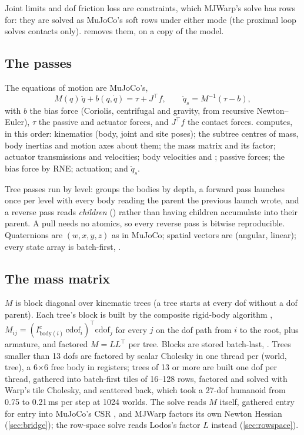 Joint limits and dof friction loss are constraints, which MJWarp's solve has rows for: they are solved as MuJoCo's soft rows under either mode (the proximal loop solves contacts only).  removes them, on a copy of the model.

\subsection{The passes}\label{sec:passes}

The equations of motion are MuJoCo's,
\begin{equation}\label{eq:eom}
M(q)\,\ddot q + b(q, \dot q) = \tau + J^\top f, \qquad \ddot q_s = M^{-1}(\tau - b),
\end{equation}
with $b$ the bias force (Coriolis, centrifugal and gravity, from recursive Newton--Euler), $\tau$ the passive and actuator forces, and $J^\top f$ the contact forces.  computes, in this order: kinematics (body, joint and site poses); the subtree centres of mass, body inertias and motion axes  about them; the mass matrix and its factor; actuator transmissions and velocities; body velocities and ; passive forces; the bias force by RNE; actuation;  and $\ddot q_s$.

Tree passes run by level:  groups the bodies by depth, a forward pass launches once per level with every body reading the parent the previous launch wrote, and a reverse pass reads \emph{children} () rather than having children accumulate into their parent. A pull needs no atomics, so every reverse pass is bitwise reproducible. Quaternions are $(w, x, y, z)$ as in MuJoCo; spatial vectors are (angular, linear); every state array is batch-first, .

\subsection{The mass matrix}\label{sec:mass}

$M$ is block diagonal over kinematic trees (a tree starts at every dof without a dof parent). Each tree's block is built by the composite rigid-body algorithm \cite{featherstone}, $M_{ij} = (I^c_{\text{body}(i)}\, \mathrm{cdof}_i)^\top \mathrm{cdof}_j$ for every $j$ on the dof path from $i$ to the root, plus armature, and factored $M = LL^\top$ per tree. Blocks are stored batch-last, . Trees smaller than 13 dofs are factored by scalar Cholesky in one thread per (world, tree), a 6$\times$6 free body in registers; trees of 13 or more are built one dof per thread, gathered into batch-first tiles of 16--128 rows, factored and solved with Warp's tile Cholesky, and scattered back, which took a 27-dof humanoid from 0.75 to 0.21\,ms per step at 1024 worlds. The solve reads $M$ itself, gathered entry for entry into MuJoCo's CSR , and MJWarp factors its own Newton Hessian (\cref{sec:bridge}); the row-space solve reads Lodos's factor $L$ instead (\cref{sec:rowspace}).

